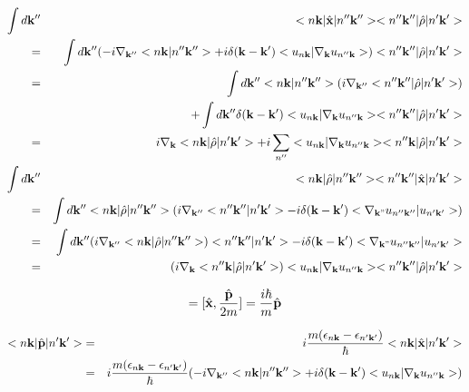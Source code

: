 \documentclass[aps,prb,preprint]{revtex4-1}
\begin{document}
\begin{appendix}
\begin{eqnarray}
\int d{\bf k''} && <n{\bf k}|\hat{\bf x}|n''{\bf k''}><n''{\bf k''}|\hat{\rho}|n'{\bf k'}> \nonumber \\
=&& \int d{\bf k''}(-i \nabla_{\bf k''} <n{\bf k}|n''{\bf k''}> + i\delta({\bf k-k'}) <u_{n{\bf k}}|\nabla_{\bf k} u_{n''{\bf k}}>)<n''{\bf k''}|\hat{\rho}|n'{\bf k'}>\nonumber \\
 =&& \int d{\bf k''} <n{\bf k}|n''{\bf k''}>(i\nabla_{\bf k''} <n''{\bf k''}|\hat{\rho}|n'{\bf k'}>) \nonumber \\
 &&+ \int d{\bf k''} \delta({\bf k-k'}) <u_{n{\bf k}}|\nabla_{\bf k} u_{n''{\bf k}}><n''{\bf k''}|\hat{\rho}|n'{\bf k'}>\nonumber \\
=&& i\nabla_{\bf k} <n{\bf k}|\hat{\rho}|n'{\bf k'}> +  i \sum_{n''}<u_{n{\bf k}}|\nabla_{\bf k} u_{n''{\bf k}}><n''{\bf k}|\hat{\rho}|n'{\bf k'}> \\
 \int d{\bf k''} && <n{\bf k}|\hat{\rho}|n''{\bf k''}><n''{\bf k''}|\hat{\bf x}|n'{\bf k'}> \nonumber \\
=&& \int d{\bf k''}<n{\bf k}|\hat{\rho}|n''{\bf k''}>( i \nabla_{\bf k''} <n''{\bf k''}|n'{\bf k'}> - i\delta({\bf k-k'}) <\nabla_{\bf k"} u_{n''{\bf k''}}|u_{n'{\bf k'}}>)\nonumber \\
 =&& \int d{\bf k''}(i \nabla_{\bf k''} <n{\bf k}|\hat{\rho}|n''{\bf k''}>) <n''{\bf k''}|n'{\bf k'}> - i\delta({\bf k-k'}) <\nabla_{\bf k"} u_{n''{\bf k''}}|u_{n'{\bf k'}}>\nonumber \\
 =&& (i\nabla_{\bf k} <n''{\bf k}|\hat{\rho}|n'{\bf k'}>) <u_{n{\bf k}}|\nabla_{\bf k} u_{n''{\bf k}}><n''{\bf k''}|\hat{\rho}|n'{\bf k'}>\nonumber \\
 \end{eqnarray} 

\begin{eqnarray}
[\hat{\bf x}, \hat{H}_0] = [\hat{\bf x}, \frac{\hat{\bf p}}{2m}]  =\frac{i \hbar}{m}\hat{\bf p}
\end{eqnarray} 

\begin{eqnarray}
<n{\bf k}|\hat{\bf p}|n'{\bf k'}> &=& i\frac{m(\epsilon_{n{\bf k}}-\epsilon_{n'{\bf k'}})}{\hbar} <n{\bf k}|\hat{\bf x}|n'{\bf k'}> \\
&=& i\frac{m(\epsilon_{n{\bf k}}-\epsilon_{n'{\bf k'}})}{\hbar}(-i \nabla_{\bf k''} <n{\bf k}|n''{\bf k''}> + i\delta({\bf k-k'}) <u_{n{\bf k}}|\nabla_{\bf k} u_{n''{\bf k}}>)
\end{eqnarray} 


\end{appendix}
\end{document}
